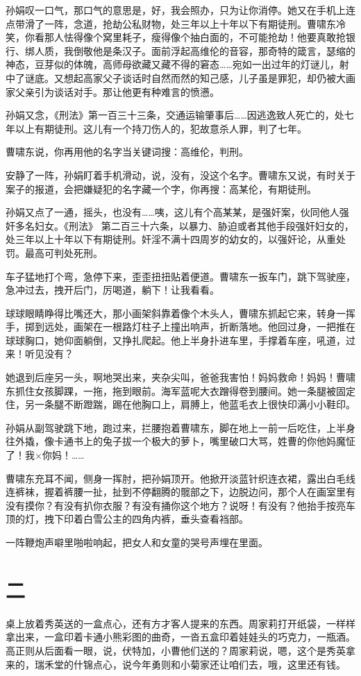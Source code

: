 \documentclass[lang=cn,newtx,12pt,scheme=chinese]{elegantbook}
\begin{document}
孙娟叹一口气，那口气的意思是，好，我会照办，只为让你消停。她又在手机上连点带滑了一阵，念道，抢劫公私财物，处三年以上十年以下有期徒刑。曹啸东冷笑，你看那人怯得像个窝里耗子，瘦得像个抽白面的，不可能抢劫！他要真敢抢银行、绑人质，我倒敬他是条汉子。面前浮起高维伦的音容，那奇特的箴言，瑟缩的神态，豆芽似的体魄，高师母欲藏又藏不得的窘态……宛如一出过年的灯谜儿，射中了谜底。又想起高家父子谈话时自然而然的知己感，儿子虽是罪犯，却仍被大画家父亲引为谈话对手。那让他更有种难言的愤懑。

孙娟又念，《刑法》第一百三十三条，交通运输肇事后……因逃逸致人死亡的，处七年以上有期徒刑。这儿有一个持刀伤人的，犯故意杀人罪，判了七年。

曹啸东说，你再用他的名字当关键词搜：高维伦，判刑。

安静了一阵，孙娟盯着手机滑动，说，没有，没这个名字。曹啸东又说，有时关于案子的报道，会把嫌疑犯的名字藏一个字，你再搜：高某伦，有期徒刑。

孙娟又点了一通，摇头，也没有……咦，这儿有个高某某，是强奸案，伙同他人强奸多名妇女。《刑法》 第二百三十六条，以暴力、胁迫或者其他手段强奸妇女的，处三年以上十年以下有期徒刑。奸淫不满十四周岁的幼女的，以强奸论，从重处罚。最高可判处死刑。

车子猛地打个弯，急停下来，歪歪扭扭贴着便道。曹啸东一扳车门，跳下驾驶座，急冲过去，拽开后门，厉喝道，躺下！让我看看。

球球眼睛睁得比嘴还大，那小画架斜靠着像个木头人，曹啸东抓起它来，转身一挥手，掷到远处，画架在一根路灯柱子上撞出响声，折断落地。他回过身，一把推在球球胸口，她仰面躺倒，又挣扎爬起。他上半身扑进车里，手撑着车座，吼道，过来！听见没有？

她退到后座另一头，啊地哭出来，夹杂尖叫，爸爸我害怕！妈妈救命！妈妈！曹啸东抓住女孩脚踝，一拖，拖到眼前。海军蓝呢大衣蹭得卷到腰间。她一条腿被固定住，另一条腿不断蹬踹，踢在他胸口上，肩膊上，他蓝毛衣上很快印满小小鞋印。

孙娟从副驾驶跳下地，跑过来，拦腰抱着曹啸东，脚在地上一前一后吃住，上半身往外撬，像卡通书上的兔子拔一个极大的萝卜，嘴里破口大骂，姓曹的你他妈魔怔了！我×你妈！……

曹啸东充耳不闻，侧身一挥肘，把孙娟顶开。他掀开淡蓝针织连衣裙，露出白毛线连裤袜，握着裤腰一扯，扯到不停翻腾的髋部之下，边脱边问，那个人在画室里有没有摸你？有没有扒你衣服？有没有捅你这个地方？说呀！有没有？他抬手按亮车顶的灯，拽下印着白雪公主的四角内裤，垂头查看裆部。

一阵鞭炮声噼里啪啦响起，把女人和女童的哭号声埋在里面。
\section{二}
桌上放着秀英送的一盒点心，还有方才客人提来的东西。周家莉打开纸袋，一样样拿出来，一盒印着卡通小熊彩图的曲奇，一沓五盒印着娃娃头的巧克力，一瓶酒。高正则从后面看一眼，说，伏特加，小曹他们送的？周家莉说，嗯，这个是秀英拿来的，瑞禾堂的什锦点心，说今年勇则和小菊家还让咱们去，哦，这里还有钱。
\end{document}
